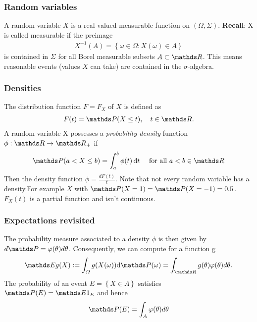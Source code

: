 \documentclass[a4paper, english, headtopline=0.08em, headsepline=0.04em, left = 1cm, right = 1cm, DIV=15]{article}
\begin{document}
\subsubsection*{Random variables}
A random variable $X$ is a real-valued measurable function on $(\Omega,\Sigma)$.
\textbf{Recall}: X is called measurable if the preimage
\begin{align*}
	X^{-1}\left(A\right) = \left\{\omega\in\Omega : X(\omega)\in A\right\}
\end{align*}
is contained in $\Sigma$ for all Borel measurable subsets $A\subset \RR $. This means 
reasonable events (values $X$ can take)
are contained in the $\sigma$-algebra.

\subsubsection*{Densities}
The distribution function $F = F_X$ of $X$ is defined as
\begin{align} \label{eq3_26}
	F(t)=\PP (X\leq t),\quad t\in\mathbb{R}.
\end{align}
A random variable X possesses a \textit{probability density}
function $\phi:\RR \rightarrow \RR_+$ if
\begin{align} \label{eq3_27}
	\PP (a < X\leq b)=\int_{a}^{b}\phi(t)\,\mathrm{d}t\quad{\mathrm{~for~all~}}a < b\in\mathbb{R}
\end{align}
Then the density function $\phi = \frac{dF(t)}{t}$. Note that not every random variable has
a density.For example $X$ with $\PP(X=1)=\PP(X=-1)=0.5$. $F_X(t)$ is a partial function and isn't continuous.

\subsubsection*{Expectations revisited}
The probability measure associated to a density $\phi$ is then given by
$d\PP  =\varphi(\theta)d\theta$.
Consequently, we can compute for a function g
\begin{align*}
\EE g(X):=\int_{\Omega}{g}(X(\omega))\mathrm{d}\PP (\omega)=\int_{\mathbb{R}}{g}(\theta)\varphi(\theta)d\theta.
\end{align*}
The probability of an event $E=\left\{X \in A\right\}$ satisfies $\PP (E) = \EE 1_E$ and hence 
\begin{align*}
	\PP (E) = \int_A \varphi(\theta)d\theta
\end{align*}
\end{document}
